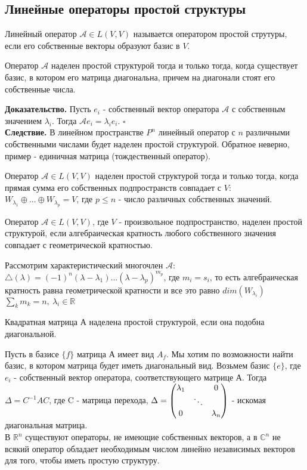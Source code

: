 \subsection{Линейные операторы простой структуры}
\begin{defin}
Линейный оператор $\mathcal A\in L(V,V)$ называется оператором простой 
струтуры, если его собственные векторы образуют базис в $V$.
\end{defin}
\begin{theor}\label{diagonal_matrix}
Оператор $\mathcal A$ наделен простой структурой тогда и только тогда, когда 
существует базис, в котором его матрица диагональна, причем на диагонали стоят
его собственные числа. 
\end{theor}
\textbf{Доказательство.} Пусть $e_i$ - собственный вектор оператора $\mathcal A$
с собственным значением $\lambda_i$. Тогда $\mathcal Ae_i=\lambda_ie_i$. $\square$\\
\textbf{Следствие.} В линейном пространстве $P^n$ линейный оператор с $n$ 
различными собственными числами будет наделен простой структурой. Обратное 
неверно, пример - единичная матрица (тождественный оператор).
\begin{theor}
Оператор $\mathcal A\in L(V,V)$ наделен простой структурой тогда и только 
тогда, когда прямая сумма его собственных подпространств совпадает с $V$: 
$W_{\lambda_1}\oplus...\oplus W_{\lambda_p}=V$, где $p\leqslant n$ - число 
различных собственных значений.
\end{theor}
\begin{theor}
Оператор $\mathcal A\in L(V,V)$, где $V$ - произвольное подпространство, 
наделен простой структурой, если алгебраическая кратность любого собственного 
значения совпадает с геометрической кратностью. 
\end{theor}
Рассмотрим характеристический многочлен $\mathcal A$:
$\triangle(\lambda)=(-1)^n(\lambda-\lambda_1)...(\lambda-\lambda_p)^{m_p}$,
где $m_i=s_i$, то есть алгебраическая кратность равна геометрической кратности
и все это равно $dim(W_{\lambda_i})$\\
$\sum\limits_k m_k=n,~\lambda_i\in\mathbb R$
\begin{defin}
Квадратная матрица А наделена простой структурой, если она подобна диагональной.
\end{defin}
Пусть в базисе $\{f\}$ матрица А имеет вид $A_f$. Мы хотим по возможности 
найти базис, в котором матрица будет иметь диагональный вид. Возьмем базис 
$\{e\}$, где $e_i$ - собственный вектор оператора, соответствующего матрице А.
Тогда $\Delta=C^{-1}AC$, где C - матрица перехода, $\Delta=\begin{pmatrix}
\lambda_1&&\large{0}\\&\ddots&\\\large{0}&&\lambda_n\end{pmatrix}$ - искомая
диагональная матрица.\\
В $\mathbb R^n$ существуют операторы, не имеющие собственных векторов, а в 
$\mathbb C^n$ не всякий оператор обладает необходимым числом линейно 
независимых векторов для того, чтобы иметь простую структуру. 


